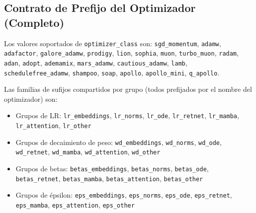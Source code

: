 \documentclass[11pt,a4paper]{article}
\begin{document}
\subsection{Contrato de Prefijo del Optimizador (Completo)}

Los valores soportados de \texttt{optimizer\_class} son:
\texttt{sgd\_momentum}, \texttt{adamw}, \texttt{adafactor}, \texttt{galore\_adamw}, \texttt{prodigy}, \texttt{lion}, \texttt{sophia}, \texttt{muon}, \texttt{turbo\_muon}, \texttt{radam}, \texttt{adan}, \texttt{adopt}, \texttt{ademamix}, \texttt{mars\_adamw}, \texttt{cautious\_adamw}, \texttt{lamb}, \texttt{schedulefree\_adamw}, \texttt{shampoo}, \texttt{soap}, \texttt{apollo}, \texttt{apollo\_mini}, \texttt{q\_apollo}.

Las familias de sufijos compartidos por grupo (todos prefijados por el nombre del optimizador) son:
\begin{itemize}[leftmargin=*]
    \item Grupos de LR: \texttt{lr\_embeddings}, \texttt{lr\_norms}, \texttt{lr\_ode}, \texttt{lr\_retnet}, \texttt{lr\_mamba}, \texttt{lr\_attention}, \texttt{lr\_other}
    \item Grupos de decaimiento de peso: \texttt{wd\_embeddings}, \texttt{wd\_norms}, \texttt{wd\_ode}, \texttt{wd\_retnet}, \texttt{wd\_mamba}, \texttt{wd\_attention}, \texttt{wd\_other}
    \item Grupos de betas: \texttt{betas\_embeddings}, \texttt{betas\_norms}, \texttt{betas\_ode}, \texttt{betas\_retnet}, \texttt{betas\_mamba}, \texttt{betas\_attention}, \texttt{betas\_other}
    \item Grupos de épsilon: \texttt{eps\_embeddings}, \texttt{eps\_norms}, \texttt{eps\_ode}, \texttt{eps\_retnet}, \texttt{eps\_mamba}, \texttt{eps\_attention}, \texttt{eps\_other}
\end{itemize}
\end{document}
